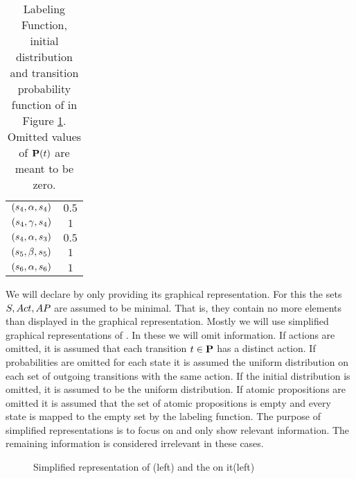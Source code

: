 \documentclass[preview]{standalone}
\begin{document}
\begin{exmp}
\begin{table}[h!]
{\begin{center}
\begin{tabular}{c|c}
				$({s}_4,{\alpha}, {s}_4)$ & $0.5$\\
				$({s}_4,{\gamma}, {s}_4)$ & $1$\\
				$({s}_4,{\alpha}, {s}_3)$ & $0.5$\\
				$({s}_5,{\beta}, {s}_5)$ & $1$\\
				$({s}_6,{\alpha}, {s}_6)$ & $1$\\				
			\end{tabular}
		\end{center}
	}
	\caption{Labeling Function, initial distribution and transition probability function of \mdpN in Figure \ref{fig:exampleMdp}. Omitted values of ${{\textbf{P}}}(t)$ are meant to be zero.}
	\label{tab:atomicpropsandlabelingfunction}
\end{table}

We will declare \mdpsN by only providing its graphical representation. For this the sets ${S}, {Act}, {AP}$ are assumed to be minimal. That is, they contain no more elements than displayed in the graphical representation. Mostly we will use simplified graphical representations of \mdpsN. In these we will omit information. If actions are omitted, it is assumed that each transition $t \in {\ensuremath{{\textbf{P}}}}$ has a distinct action. If probabilities are omitted for each state it is assumed the uniform distribution on each set of outgoing transitions with the same action. If the initial distribution is omitted, it is assumed to be the uniform distribution. If atomic propositions are omitted it is assumed that the set of atomic propositions is empty and every state is mapped to the empty set by the labeling function. The purpose of simplified representations is to focus on and only show relevant information. The remaining information is considered irrelevant in these cases.



\begin{figure}[t]
	\centering 
	\caption{Simplified representation of \mdp (left) and the \viewN \viewinitstates on it(left)}
	\label{fig:exampleMdp}  
\end{figure}
\end{exmp}

\end{document}
